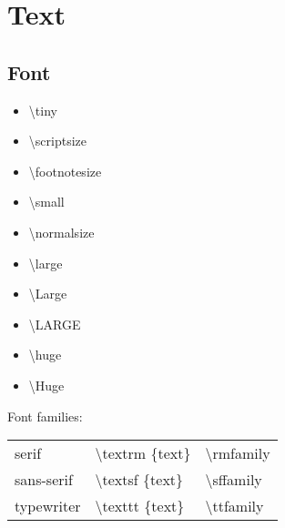 \section{Text}

\subsection*{Font}
\begin{multicols}{2}
\begin{itemize}
    \item \textbackslash tiny
    \item \textbackslash scriptsize
    \item \textbackslash footnotesize
    \item \textbackslash small
    \item \textbackslash normalsize
    \item \textbackslash large
    \item \textbackslash Large
    \item \textbackslash LARGE
    \item \textbackslash huge
    \item \textbackslash Huge
\end{itemize}
\end{multicols}
Font families: \\
\begin{tabular}{l l l}
serif & \textbackslash textrm \{text\} & \textbackslash rmfamily \\
sans-serif & \textbackslash textsf \{text\} & \textbackslash sffamily \\
typewriter & \textbackslash texttt \{text\} & \textbackslash ttfamily \\
\end{tabular}

